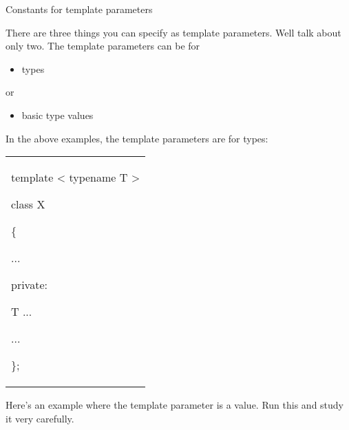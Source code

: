 \documentclass[
]{article}
\providecommand{\tightlist}{%
  \setlength{\itemsep}{0pt}\setlength{\parskip}{0pt}}
\begin{document}
Constants for template parameters

There are three things you can specify as template parameters.
We\textquotesingle ll talk about only two. The template parameters can
be for

\begin{itemize}
\tightlist
\item
  types
\end{itemize}

or

\begin{itemize}
\tightlist
\item
  basic type values
\end{itemize}

In the above examples, the template parameters are for types:

\begin{longtable}[]{@{}
  >{\raggedright\arraybackslash}p{}@{}}
\toprule\noalign{}
 \\
\midrule\noalign{}
\endhead
\bottomrule\noalign{}
\endlastfoot
template \textless{} typename T \textgreater{}

class X

\{

...

private:

T ...

...

\}; \\
\end{longtable}

Here's an example where the template parameter is a value. Run this and
study it very carefully.
\end{document}
